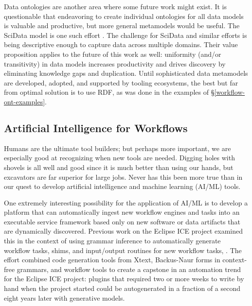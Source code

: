 Data ontologies are another area where some future work might exist. It is
questionable that endeavoring to create individual ontologies for all data
models is valuable and productive, but more general metamodels would be useful.
The SciData model is one such effort \cite{noauthor_scidata_nodate}. The
challenge for SciData and similar efforts is being descriptive enough to capture
data across multiple domains. Their value proposition applies to the future of
this work as well: uniformity (and/or transitivity) in data models increases
productivity and drives discovery by eliminating knowledge gaps and duplication.
Until sophisticated data metamodels are developed, adopted, and supported by
tooling ecosystems, the best but far from optimal solution is to use RDF, as was
done in the examples of \S \ref{workflow-ont-examples}.

\subsection{Artificial Intelligence for Workflows}

Humans are the ultimate tool builders; but perhaps more important, we are
especially good at recognizing when new tools are needed. Digging holes with
shovels is all well and good since it is much better than using our hands, but
excavators are far superior for large jobs. Never has this been more true than
in our quest to develop artificial intelligence and machine learning (AI/ML)
tools.

One extremely interesting possibility for the application of AI/ML is to develop
a platform that can automatically ingest new workflow engines and tasks into an
executable service framework based only on new software or data artifacts that
are dynamically discovered. Previous work on the Eclipse ICE project examined
this in the context of using grammar inference to automatically generate
workflow tasks, shims, and input/output routines for new workflow tasks,
\cite{bennett_rapid_2015}. The effort combined code generation tools from Xtext,
Backus-Naur forms in context-free grammars, and workflow tools to create a
capstone in an automation trend for the Eclipse ICE project: plugins that
required two or more weeks to write by hand when the project started could be
autogenerated in a fraction of a second eight years later with generative
models.

